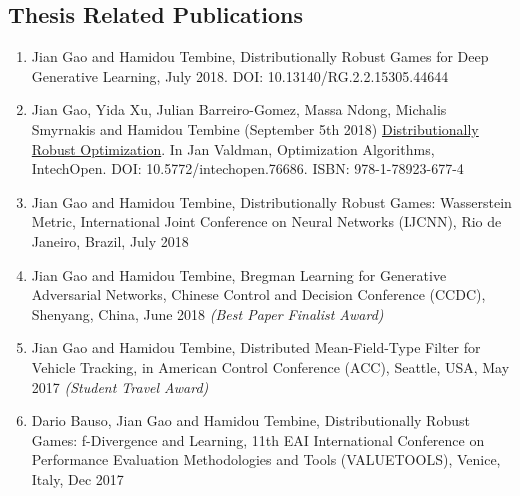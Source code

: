 \documentclass{article}
\begin{document}
\subsection{Thesis Related Publications}
\begin{enumerate}
\item[] Jian Gao and Hamidou Tembine, Distributionally Robust Games for Deep Generative Learning, July 2018. DOI: 10.13140/RG.2.2.15305.44644
\item[] Jian Gao, Yida Xu, Julian Barreiro-Gomez, Massa Ndong, Michalis Smyrnakis and Hamidou Tembine (September 5th 2018) \href{https://www.intechopen.com/books/optimization-algorithms-examples/distributionally-robust-optimization}{Distributionally Robust Optimization}. In Jan Valdman, Optimization Algorithms, IntechOpen. DOI: 10.5772/intechopen.76686. ISBN: 978-1-78923-677-4
\item[] Jian Gao and Hamidou Tembine, Distributionally Robust Games: Wasserstein Metric, International Joint Conference on Neural Networks (IJCNN), Rio de Janeiro, Brazil, July 2018
\item[] Jian Gao and Hamidou Tembine, Bregman Learning for Generative Adversarial Networks, Chinese Control and Decision Conference (CCDC), Shenyang, China, June 2018 \textit{(Best Paper Finalist Award)}
\item[] Jian Gao and Hamidou Tembine, Distributed Mean-Field-Type Filter for Vehicle Tracking, in American Control Conference (ACC), Seattle, USA, May 2017 \textit{(Student Travel Award)}
\item[] Dario Bauso, Jian Gao and Hamidou Tembine, Distributionally Robust Games: f-Divergence and Learning, 11th EAI International Conference on Performance Evaluation Methodologies and Tools (VALUETOOLS), Venice, Italy, Dec 2017
\end{enumerate}
\end{document}
